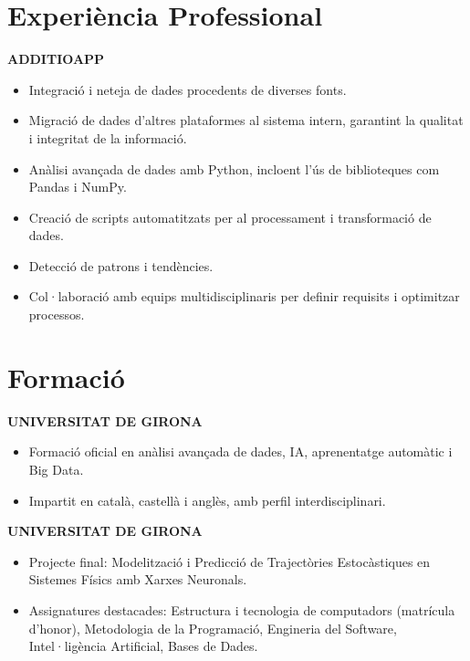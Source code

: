 \documentclass[11pt,a4paper]{article}
\newcommand{\runsubsection}[1]{\color{subheadings}\fontsize{12pt}{12pt}\selectfont\bfseries\uppercase{#1}\normalfont}
\newcommand{\descript}[1]{\color{subheadings}\raggedright\scshape\fontsize{11pt}{13pt}\selectfont{#1 \\}\normalfont}
\newcommand{\location}[1]{\color{headings}\raggedright\fontsize{10pt}{12pt}\selectfont{#1\\}\normalfont}
\newcommand{\sectionsep}{\vspace{8pt}}
\newenvironment{tightemize}{\vspace{-\topsep}\begin{itemize}\itemsep1pt \parskip0pt \parsep0pt}{\end{itemize}\vspace{-\topsep}}
\begin{document}
\begin{multicols}{2}

\section{Experiència Professional}

\runsubsection{AdditioApp}
\descript{Data Science}
\location{Octubre 2024 – Actualitat | Girona}
\sectionsep
\begin{tightemize}
    \item Integració i neteja de dades procedents de diverses fonts.
    \item Migració de dades d'altres plataformes al sistema intern, garantint la qualitat i integritat de la informació.
    \item Anàlisi avançada de dades amb Python, incloent l'ús de biblioteques com Pandas i NumPy.
    \item Creació de scripts automatitzats per al processament i transformació de dades.
    \item Detecció de patrons i tendències.
    \item Col·laboració amb equips multidisciplinaris per definir requisits i optimitzar processos.
\end{tightemize}
\sectionsep


\section{Formació}

\runsubsection{Universitat de Girona}

\descript{Màster en Ciència de Dades}
\location{2025 – 2026 (en curs) | Girona}
\sectionsep
\begin{tightemize}
\item Formació oficial en anàlisi avançada de dades, IA, aprenentatge automàtic i Big Data.
\item Impartit en català, castellà i anglès, amb perfil interdisciplinari.
\end{tightemize}
\sectionsep

\runsubsection{Universitat de Girona}

\descript{Grau en Enginyeria Informàtica}
\location{2021 – 2025 | Girona}
\sectionsep
\begin{tightemize}
\item Projecte final: Modelització i Predicció de Trajectòries Estocàstiques en Sistemes Físics amb Xarxes Neuronals.
\item Assignatures destacades: Estructura i tecnologia de computadors (matrícula d'honor), Metodologia de la Programació, Engineria del Software, Intel·ligència Artificial, Bases de Dades.
\end{tightemize}
\sectionsep


\end{multicols}
\end{document}
